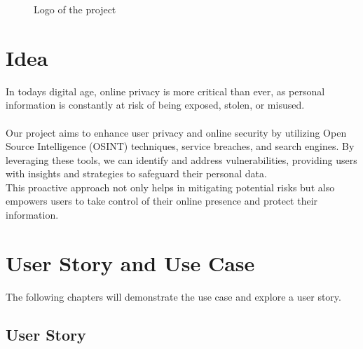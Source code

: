 \documentclass[
    a4paper,
    pagesize,
	pdftex,
    12pt,
]{scrartcl}
\begin{document}
\begin{figure}[H]
	\centering
	
	\caption{Logo of the project}
	\label{fig:logo}
\end{figure} 

\section{Idea}
In todays digital age, online privacy is more critical than ever, as personal information is constantly at risk of being exposed, stolen, or misused.
\\ \\
Our project aims to enhance user privacy and online security by utilizing Open Source Intelligence (OSINT) techniques, service breaches, and search engines. By leveraging these tools, we can identify and address vulnerabilities, providing users with insights and strategies to safeguard their personal data. \\
This proactive approach not only helps in mitigating potential risks but also empowers users to take control of their online presence and protect their information.

\section{User Story and Use Case}
The following chapters will demonstrate the use case and explore a user story.

\subsection{User Story}
\end{document}
